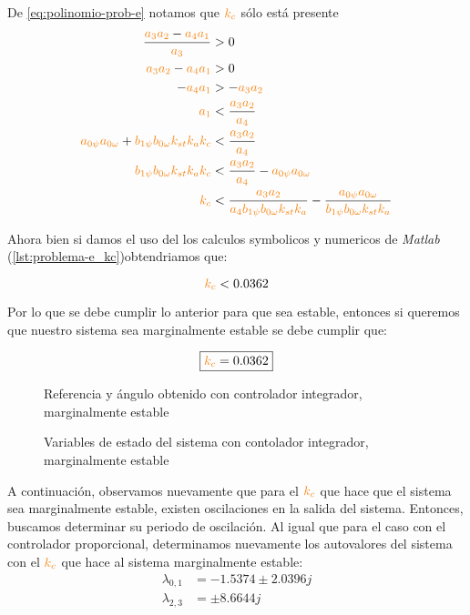 De \eqref{eq:polinomio-prob-e} notamos que $\nara{k_{c}}$ sólo está presente
\begin{align} 
  \frac{\nara{a_3 a_2} - \nara{a_4 a_1}}{\nara{a_3}} &> 0 \\
  \nara{a_3 a_2} - \nara{a_4 a_1} &> 0 \\
  - \nara{a_4 a_1} &> - \nara{a_3 a_2} \\
  \nara{a_1} &< \frac{\nara{a_3 a_2}}{\nara{a_4}} \\
  \nara{a_{0\psi} a_{0\omega}} + \nara{b_{1\psi} b_{0\omega} k_{st} k_a k_c} &< \frac{\nara{a_3 a_2}}{\nara{a_4}} \\
  \nara{b_{1\psi} b_{0\omega} k_{st} k_a k_c} &< \frac{\nara{a_3 a_2}}{\nara{a_4}} - \nara{a_{0\psi} a_{0\omega}} \\
  \nara{k_c}  &< \frac{\nara{a_3 a_2}}{\nara{a_4 b_{1\psi} b_{0\omega} k_{st} k_a}}  - \frac{\nara{a_{0\psi} a_{0\omega}}}{\nara{b_{1\psi} b_{0\omega} k_{st} k_a}}  \\
\end{align}

Ahora bien si damos el uso del los calculos symbolicos y numericos de \textit{Matlab} (\autoref{lst:problema-e_kc})obtendriamos que: 

\begin{equation}
  \nara{k_c} < 0.0362
\end{equation}

Por lo que se debe cumplir lo anterior para que sea estable, entonces si queremos que nuestro sistema sea marginalmente estable se debe cumplir que:

\begin{equation}
  \boxed{\nara{k_c} = 0.0362}
\end{equation}

\begin{figure}[h]
  \centering
  
  \caption{Referencia y ángulo obtenido con controlador integrador, marginalmente estable}\label{fig:psi-marge-int}
\end{figure}

\begin{figure}[h]
  \centering
  
  \caption{Variables de estado del sistema con contolador integrador, marginalmente estable}\label{fig:estado-marge-int}
\end{figure}

A continuación, observamos nuevamente que para el $\nara{k_{c}}$ que hace que el
sistema sea marginalmente estable, existen oscilaciones en la salida del sistema.
Entonces, buscamos determinar su periodo de oscilación. Al igual que para el caso
con el controlador proporcional, determinamos nuevamente los autovalores del sistema
con el $\nara{k_{c}}$ que hace al sistema marginalmente estable:
\begin{align*}
  \lambda_{0,1} &= -1.5374 \pm 2.0396j \\
  \lambda_{2,3} &= \pm 8.6644j
\end{align*}

